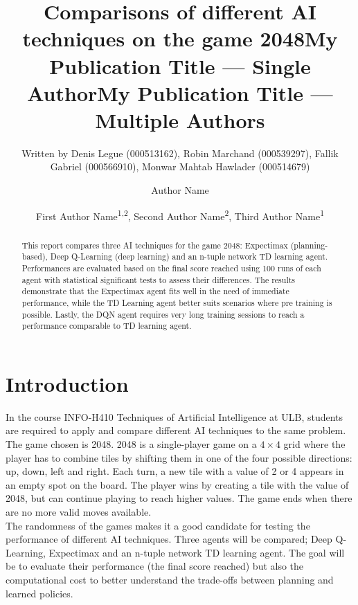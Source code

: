 \documentclass[letterpaper]{article} %
\title{Comparisons of different AI techniques on the game 2048}
\author{
    Written by Denis Legue (000513162), Robin Marchand (000539297), Fallik Gabriel (000566910), Monwar Mahtab Hawlader (000514679)
}
\title{My Publication Title --- Single Author}
\author {
    Author Name
}
\title{My Publication Title --- Multiple Authors}
\author {
    First Author Name\textsuperscript{\rm 1,\rm 2},
    Second Author Name\textsuperscript{\rm 2},
    Third Author Name\textsuperscript{\rm 1}
}
\begin{document}
\maketitle

\begin{abstract}

    This report compares three AI techniques for the game 2048: Expectimax (planning-based), Deep Q-Learning (deep learning) and an n-tuple network TD learning agent.
    Performances are evaluated based on the final score reached using 100 runs of each agent with statistical significant tests to assess their differences.
    The results demonstrate that the Expectimax agent fits well in the need of immediate performance, while the TD Learning agent better suits scenarios where pre training is possible.
    Lastly, the DQN agent requires very long training sessions to reach a performance comparable to TD learning agent.


\end{abstract}

\begin{links}
\end{links}

\section{Introduction}

In the course INFO-H410 Techniques of Artificial Intelligence at ULB, students are required to apply and compare different AI techniques to the same problem.
The game chosen is 2048. 2048 is a single-player game on a $4\times4$ grid where the player has to combine tiles by shifting them in one of the four 
possible directions: up, down, left and right.
Each turn, a new tile with a value of 2 or 4 appears in an empty spot on the board. The player wins by creating a tile with the value of 2048, 
but can continue playing to reach higher values. The game ends when there are no more valid moves available.\\
The randomness of the games makes it a good candidate for testing the performance of different AI techniques.  
Three agents will be compared; Deep Q-Learning, Expectimax and an n-tuple network TD learning agent.
The goal will be to evaluate their performance (the final score reached) but also the computational cost to better understand the trade-offs between planning and learned policies.
\end{document}
